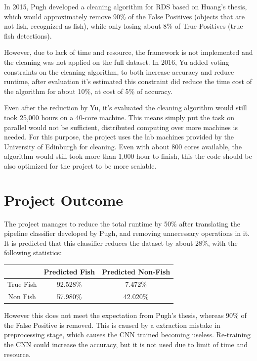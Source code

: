 \documentclass[bsc,logo,twoside,fullspacing,parskip]{infthesis}
\begin{document}
In 2015, Pugh\cite{Pugh} developed a cleaning algorithm for RDS based on Huang's thesis\cite{Huang}, which would approximately remove 90\% of the False Positives (objects that are not fish, recognized as fish), while only losing about 8\% of True Positives (true fish detections). 

However, due to lack of time and resource, the framework is not implemented and the cleaning was not applied on the full dataset.
In 2016, Yu\cite{Yu} added voting constraints on the cleaning algorithm, to both increase accuracy and reduce runtime, after evaluation it's estimated this constraint did reduce the time cost of the algorithm for about 10\%, at cost of 5\% of accuracy.

Even after the reduction by Yu, it's evaluated the cleaning algorithm would still took 25,000 hours on a 40-core machine\cite{Yu}.
This means simply put the task on parallel would not be sufficient, distributed computing over more machines is needed.
For this purpose, the project uses the lab machines provided by the University of Edinburgh for cleaning. 
Even with about 800 cores available, the algorithm would still took more than 1,000 hour to finish, this the code should be also optimized for the project to be more scalable.

\section{Project Outcome}

The project manages to reduce the total runtime by 50\% after translating the pipeline classifier developed by Pugh\cite{Pugh}, and removing unnecessary operations in it. 
It is predicted that this classifier reduces the dataset by about 28\%, with the following statistics:

\begin{center}
\begin{tabular}{ |c|c|c| }
\hline 
$ $ & Predicted Fish & Predicted Non-Fish \\
\hline 
True Fish & 92.528\% & 7.472\% \\
Non Fish & 57.980\% & 42.020\% \\
\hline 
\end{tabular}
\end{center}

However this does not meet the expectation from Pugh's thesis, whereas 90\% of the False Positive is removed. 
This is caused by a extraction mistake in preprocessing stage, which causes the CNN trained becoming useless. 
Re-training the CNN could increase the accuracy, but it is not used due to limit of time and resource.
\end{document}
